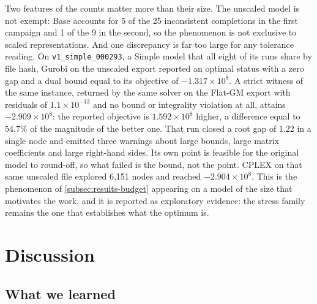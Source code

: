 \documentclass[smallextended,envcountsect,envcountsame]{svjour3}
\begin{document}
Two features of the counts matter more than their size. The unscaled model is not exempt: Base
accounts for 5 of the 25 inconsistent completions in the first campaign and 1 of the 9 in the
second, so the phenomenon is not exclusive to scaled representations. And one discrepancy is
far too large for any tolerance reading. On \texttt{v1\_simple\_000293}, a Simple model that
all eight of its runs share by file hash, Gurobi on the unscaled export reported an optimal
status with a zero gap and a dual bound equal to its objective of $-1.317\times10^{8}$. A
strict witness of the same instance, returned by the same solver on the Flat-GM export with
residuals of $1.1\times10^{-13}$ and no bound or integrality violation at all, attains
$-2.909\times10^{8}$: the reported objective is $1.592\times10^{8}$ higher, a difference equal
to $54.7\%$ of the magnitude of the better one. That run closed a root gap of $1.22$ in a
single node and emitted three warnings about large bounds, large matrix coefficients and large
right-hand sides. Its own point is feasible for the original model to round-off, so what failed
is the bound, not the point. CPLEX on that same unscaled file explored 6,151 nodes and reached
$-2.904\times10^{8}$. This is the phenomenon of \cref{subsec:results-budget} appearing on a
model of the size that motivates the work, and it is reported as exploratory evidence: the
stress family remains the one that establishes what the optimum is.

\begin{table}[tb]
\centering\small
\caption{Cross-run certificate audit. Witnesses are points whose residuals against the original
model are at most $10^{-9}$ in relative activity, bounds and integrality. ``Dual bound'' counts
runs whose reported bound lies above such a point; ``Certificate'' counts the subset that also
reported completion at an objective further from it than the requested gap. ``Instances'' is
the number of distinct models in which a run of either kind occurs. Neither campaign is a
census and neither estimates a rate.}
\label{tab:certificate-audit}

\end{table}

\section{Discussion}
\label{sec:discussion}
\subsection{What we learned}
\end{document}

